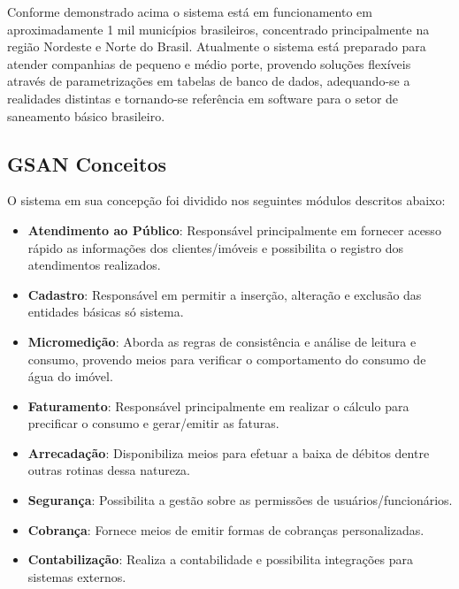 Conforme demonstrado acima o sistema está em funcionamento em aproximadamente 1 mil municípios brasileiros, concentrado principalmente na região Nordeste e Norte do Brasil. Atualmente o sistema está preparado para atender companhias de pequeno e médio porte, provendo soluções flexíveis através de parametrizações em tabelas de banco de dados, adequando-se a realidades distintas e tornando-se referência em software para o setor de saneamento básico brasileiro. 

\subsection{GSAN Conceitos}

O sistema em sua concepção foi dividido nos seguintes módulos descritos abaixo:

\begin{itemize}
\item \textbf{Atendimento ao Público}: Responsável principalmente em fornecer acesso rápido as informações dos clientes/imóveis e possibilita o registro dos atendimentos realizados. \\
\item \textbf{Cadastro}: Responsável em permitir a inserção, alteração e exclusão das entidades básicas só sistema. \\
\item \textbf{Micromedição}: Aborda as regras de consistência e análise de leitura e consumo, provendo meios para verificar o comportamento do consumo de água do imóvel. \\
\item \textbf{Faturamento}: Responsável principalmente em realizar o cálculo para precificar o consumo e gerar/emitir as faturas. \\
\item \textbf{Arrecadação}: Disponibiliza meios para efetuar a baixa de débitos dentre outras rotinas dessa natureza. \\
\item \textbf{Segurança}: Possibilita a gestão sobre as permissões de usuários/funcionários. \\
\item \textbf{Cobrança}: Fornece meios de emitir formas de cobranças personalizadas. \\
\item \textbf{Contabilização}: Realiza a contabilidade e possibilita integrações para sistemas externos. \\
\end{itemize}

